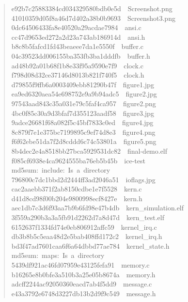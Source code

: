 \documentclass[letterpaper]{article}
\begin{document}
\begin{quote}
{e92b7c25883384cd034329580bdb0e5d~~Screenshot.png\\
41010359d05f8a46d7d402a38b0b9693~~Screenshot3.png\\
0dc64506433fa8e40520a29acdae7984~~ansi.c\\
cc47d9653ed272a2d23a743ab186914d~~ansi.h\\
b8c8b5fafcd1fd43beaeee7da1e5550f~~buffer.c\\
04c39523dd006155ba353fb3ba1dddfb~~buffer.h\\
ad48b92a01b68f1b8e33f95a9590e7f9~~clock.c\\
f798d08d32ce37146d8013b821f740f5~~clock.h\\
d79855f9ffb6a0003409ebb81290b47f~~figure1.jpg\\
ea9ed6320aea54e698752e9a9b94adc5~~figure2.jpg\\
97543aad843c35a031e79c5faf4ca957~~figure2.png\\
4bc0f85c30a9d3bfaf7d355123aadf58~~figure3.jpg\\
9adce26681f68a082f5c45bf7833c0ed~~figure4.jpg\\
8c879f7e1e375bc7199895c9ef74d8e3~~figure4.png\\
f6f62ebe51da7f2d8cddd6c74c53801a~~figure5.png\\
8b4dec2e4a8518bb27bca5929531dc82~~final-demo.elf\\
f085cf6938e4ca9624555ba76eb5b45b~~ice-test\\
md5sum:~include:~Is~a~directory\\
796800c7dc1bbd2d2444ff3ad2046a51~~ioflags.jpg\\
cac2aaebb371f2ab8150cdbe1e7f5528~~kern.c\\
d41d8cd98f00b204e9800998ecf8427e~~kern.h\\
aec1db7c3d6f93aa7b9b6fd98e47b4db~~kern\_simulation.elf\\
3f559a290b3a3a5fb91d2262d7a8d47d~~kern\_test.elf\\
6152637f1334fd74e0eb806912affc59~~kernel\_irq.c\\
db3b8b5c5eaa48d2e5bab408ffd172c2~~kernel\_irq.h\\
bd3f47ad7601caa6f6a64dbbd77ae784~~kernel\_state.h\\
md5sum:~maps:~Is~a~directory\\
5439df921ac46fd07959e43125fefa91~~memory.c\\
b16265e8b0bfe3a510b3a25e05b8674a~~memory.h\\
adcff2244ac92050360eacd7ab4f5dd9~~message.c\\
e43a3792e6748d3227db13b2d9f9c549~~message.h\\
}
\end{quote}
\end{document}
